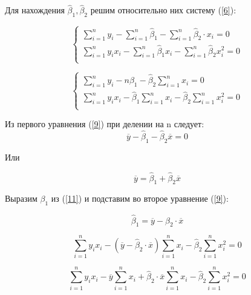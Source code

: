\documentclass[14pt,a4paper]{scrartcl}
\begin{document}
Для нахождения $\hat \beta_1,\hat \beta_2$ решим относительно них систему (\ref{6}):

\begin{equation}\label{8}
\begin{cases} 
\sum\limits_{i=1}^{n}y_i - \sum\limits_{i=1}^{n}\hat \beta_1 - \sum\limits_{i=1}^{n} \hat \beta_2 \cdot x_i = 0 \\
\sum\limits_{i=1}^{n}y_ix_i - \sum\limits_{i=1}^{n}\hat\beta_1 x_i - \sum\limits_{i=1}^{n}\hat\beta_2x_i^2 = 0 \\ 
\end{cases}	
\end{equation}


\begin{equation}\label{9}
\begin{cases} 
	\sum\limits_{i=1}^{n}y_i - n\beta_1 - \hat \beta_2 \sum\limits_{i=1}^{n}  x_i = 0 \\
	\sum\limits_{i=1}^{n}y_ix_i - \hat\beta_1\sum\limits_{i=1}^{n} x_i - \hat\beta_2\sum\limits_{i=1}^{n}x_i^2 = 0 \\ 
\end{cases}	
\end{equation}

Из первого уравнения (\ref{9}) при делении на n следует:
\begin{equation}\label{10}
	\overline{y} - \hat \beta_1 - \hat \beta_2 \overline{x} = 0
\end{equation}

Или

\begin{equation}\label{11}
\overline{y} = \hat \beta_1 + \hat \beta_2 \overline{x}
\end{equation}

Выразим $\beta_1$ из (\ref{11}) и подставим во второе уравнение (\ref{9}):

\begin{equation}\label{12}
	\hat\beta_1 = \overline{y} - \hat \beta_2 \cdot \overline{x}
\end{equation}

\begin{equation}\label{13}
	\sum\limits_{i=1}^{n} y_ix_i - (\overline{y} - \hat\beta_2\cdot\overline{x})\sum\limits_{i=1}^{n}x_i - \hat\beta_2\sum\limits_{i=1}^{n}x_i^2 = 0
\end{equation}

\begin{equation}\label{14}
	\sum\limits_{i=1}^{n} y_ix_i - \overline{y}\sum\limits_{i=1}^{n}x_i + \hat\beta_2\cdot\overline{x}\sum\limits_{i=1}^{n}x_i - \hat\beta_2\sum\limits_{i=1}^{n}x_i^2 = 0
\end{equation}
\end{document}
